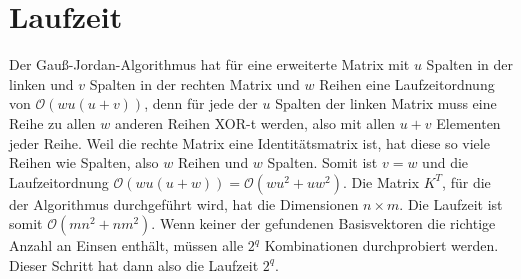 \documentclass[a4paper,10pt,ngerman]{scrartcl}
\begin{document}
\section{Laufzeit}
Der Gauß-Jordan-Algorithmus hat für eine erweiterte Matrix mit $u$ Spalten in der linken und $v$ Spalten in der rechten Matrix und $w$ Reihen eine Laufzeitordnung von $\mathcal{O}(wu(u+v))$, denn für jede der $u$ Spalten der linken Matrix muss eine Reihe zu allen $w$ anderen Reihen XOR-t werden, also mit allen $u+v$ Elementen jeder Reihe. Weil die rechte Matrix eine Identitätsmatrix ist, hat diese so viele Reihen wie Spalten, also $w$ Reihen und $w$ Spalten. Somit ist $v=w$ und die Laufzeitordnung $\mathcal{O}(wu(u+w))=\mathcal{O}(wu^2+uw^2)$. Die Matrix $K^T$, für die der Algorithmus durchgeführt wird, hat die Dimensionen $n \times m$. Die Laufzeit ist somit $\mathcal{O}(mn^2+nm^2)$. Wenn keiner der gefundenen Basisvektoren die richtige Anzahl an Einsen enthält, müssen alle $2^q$ Kombinationen durchprobiert werden. Dieser Schritt hat dann also die Laufzeit $2^q$.
\end{document}
